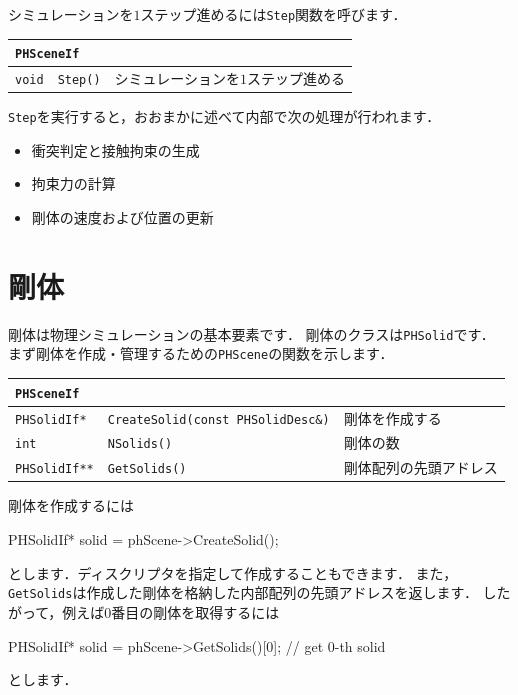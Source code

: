 \KLUDGE シミュレーションを$1$\KLUDGE ステップ進めるには\texttt{Step}\KLUDGE 関数を呼びます．

\begin{center}
\begin{tabular}{p{.15\hsize}p{.3\hsize}p{.45\hsize}}
\multicolumn{3}{l}{\texttt{PHSceneIf}}		\\ \midrule
\texttt{void}	& \texttt{Step()}	& \KLUDGE シミュレーションを$1$\KLUDGE ステップ進める \\
\end{tabular}
\end{center}

\texttt{Step}\KLUDGE を実行すると，おおまかに述べて内部で次の処理が行われます．
\begin{itemize}
\item \KLUDGE 衝突判定と接触拘束の生成
\item \KLUDGE 拘束力の計算
\item \KLUDGE 剛体の速度および位置の更新
\end{itemize}

\section{\KLUDGE 剛体}

\KLUDGE 剛体は物理シミュレーションの基本要素です．
\KLUDGE 剛体のクラスは\texttt{PHSolid}\KLUDGE です．
\KLUDGE まず剛体を作成・管理するための\texttt{PHScene}\KLUDGE の関数を示します．

\begin{center}
\begin{tabular}{p{.15\hsize}p{.45\hsize}p{.30\hsize}}
\multicolumn{3}{l}{\texttt{PHSceneIf}}									\\ \midrule
\texttt{PHSolidIf*}		& \texttt{CreateSolid(const PHSolidDesc\&)}	& \KLUDGE 剛体を作成する \\
\texttt{int}			& \texttt{NSolids()}						& \KLUDGE 剛体の数 \\
\texttt{PHSolidIf**} 	& \texttt{GetSolids()}						& \KLUDGE 剛体配列の先頭アドレス \\
\end{tabular}
\end{center}

\KLUDGE 剛体を作成するには
\begin{sourcecode}
PHSolidIf* solid = phScene->CreateSolid();
\end{sourcecode}
\KLUDGE とします．ディスクリプタを指定して作成することもできます．
\KLUDGE また，\texttt{GetSolids}\KLUDGE は作成した剛体を格納した内部配列の先頭アドレスを返します．
\KLUDGE したがって，例えば$0$\KLUDGE 番目の剛体を取得するには
\begin{sourcecode}
PHSolidIf* solid = phScene->GetSolids()[0];      // get 0-th solid
\end{sourcecode}
\KLUDGE とします．

